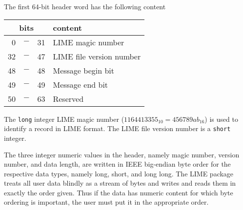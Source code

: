 \documentclass{article}
\begin{document}
The first 64-bit header word has the following content
%
\begin{center}
  \begin{tabular}{|rcr|l|}
    \hline
    \multicolumn{3}{|c|}{bits}  & content \\
    \hline
       0 & $-$ &  31 & LIME magic number \\
      32 & $-$ &  47 & LIME file version number \\
      48 & $-$ &  48 & Message begin bit \\
      49 & $-$ &  49 & Message end bit \\
      50 & $-$ &  63 & Reserved \\
    \hline
  \end{tabular}
\end{center}

The {\tt long} integer LIME magic number ($1164413355_{10} =
456789ab_{16}$) is used to identify a record in LIME format.  The LIME
file version number is a {\tt short} integer.

The three integer numeric values in the header, namely magic number,
version number, and data length, are written in IEEE big-endian byte
order for the respective data types, namely long, short, and long
long.  The LIME package treats all user data blindly as a stream of
bytes and writes and reads them in exactly the order given.  Thus if
the data has numeric content for which byte ordering is important, the
user must put it in the appropriate order.
\end{document}
